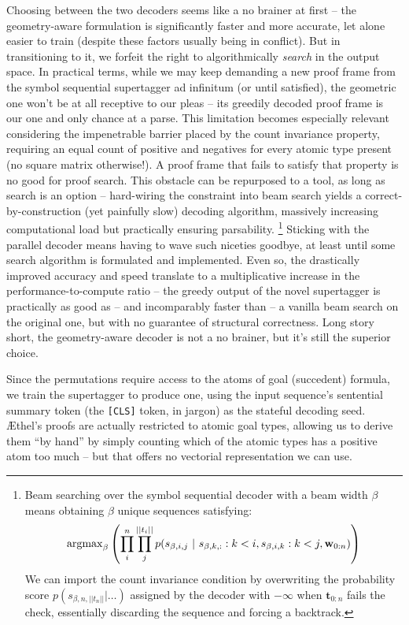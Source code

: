 Choosing between the two decoders seems like a no brainer at first -- the geometry-aware formulation is significantly faster and more accurate, let alone easier to train (despite these factors usually being in conflict).
But in transitioning to it, we forfeit the right to algorithmically \textit{search} in the output space.
In practical terms, while we may keep demanding a new proof frame from the symbol sequential supertagger ad infinitum (or until satisfied), the geometric one won't be at all receptive to our pleas -- its greedily decoded proof frame is our one and only chance at a parse.
This limitation becomes especially relevant considering the impenetrable barrier placed by the count invariance property, requiring an equal count of positive and negatives for every atomic type present (no square matrix otherwise!).
A proof frame that fails to satisfy that property is no good for proof search.
This obstacle can be repurposed to a tool, as long as search is an option -- hard-wiring the constraint into beam search yields a correct-by-construction (yet painfully slow) decoding algorithm, massively increasing computational load but practically ensuring parsability.%
	\footnote{
	Beam searching over the symbol sequential decoder with a beam width $\beta$ means obtaining $\beta$ unique sequences satisfying:
	\[
		\mathrm{argmax}_{\beta}\left(
		\prod_i^n \prod_j^{|| t_i ||} 
		p(s_{\beta, i, j} \ | \ 
			s_{\beta, k, :} : k < i,
			s_{\beta, i, k} : k < j,
			\wseq)
		\right)
	\]
	We can import the count invariance condition by overwriting the probability score $p(s_{\beta, n, ||t_n||} | \dots )$ assigned by the decoder with $-\infty$ when $\mathbf{t}_{0:n}$ fails the check, essentially discarding the sequence and forcing a backtrack.
}
Sticking with the parallel decoder means having to wave such niceties goodbye, at least until some search algorithm is formulated and implemented.
Even so, the drastically improved accuracy and speed translate to a multiplicative increase in the performance-to-compute ratio -- the greedy output of the novel supertagger is practically as good as -- and incomparably faster than -- a vanilla beam search on the original one, but with no guarantee of structural correctness.
Long story short, the geometry-aware decoder is not a no brainer, but it's still the superior choice.

Since the permutations require access to the atoms of goal (succedent) formula, we train the supertagger to produce one, using the input sequence's sentential summary token (the \texttt{[CLS]} token, in jargon) as the stateful decoding seed.
\AE thel's proofs are actually restricted to atomic goal types, allowing us to derive them ``by hand'' by simply counting which of the atomic types has a positive atom too much -- but that offers no vectorial representation we can use.


